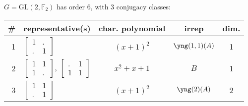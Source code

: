 \documentclass[11pt,oneside]{article}
\newcommand{\GL}{\mathrm{GL}}
\newcommand{\Field}{\mathbb{F}}
\begin{document}
$G=\GL(2,\Field_2)$ has order 6, with 3 conjugacy classes:
\begin{center}
\begin{tabular}{r|l|c|c|c}
\# & representative(s) & char. polynomial & irrep & dim. \\
\hline
1  & $\begin{bmatrix}1&.\\.&1\end{bmatrix}$    & $(x+1)^2$  & $\yng(1,1)(A)$  & 1 \\
2  & $\begin{bmatrix}1&1\\1&.\end{bmatrix}$, $\begin{bmatrix}.&1\\1&1\end{bmatrix}$     & $x^2+x+1$  &  $B$  & 1 \\
3  & $\begin{bmatrix}1&1\\.&1\end{bmatrix}$    & $(x+1)^2$  & $\yng(2)(A)$ & 2  \\
\end{tabular}
\end{center}
\end{document}
